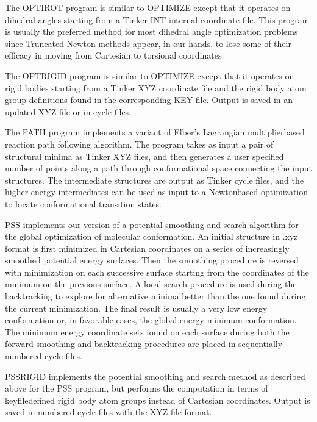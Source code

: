 \documentclass[letterpaper,11pt,english]{sphinxmanual}
\begin{document}

The OPTIROT program is similar to OPTIMIZE except that it operates on dihedral angles starting from a Tinker INT internal coordinate file. This program is usually the preferred method for most dihedral angle optimization problems since Truncated Newton methods appear, in our hands, to lose some of their efficacy in moving from Cartesian to torsional coordinates.


The OPTRIGID program is similar to OPTIMIZE except that it operates on rigid bodies starting from a Tinker XYZ coordinate file and the rigid body atom group definitions found in the corresponding KEY file. Output is saved in an updated XYZ file or in cycle files.


The PATH program implements a variant of Elber’s Lagrangian multiplier\sphinxhyphen{}based reaction path following algorithm. The program takes as input a pair of structural minima as Tinker XYZ files, and then generates a user specified number of points along a path through conformational space connecting the input structures. The intermediate structures are output as Tinker cycle files, and the higher energy intermediates can be used as input to a Newton\sphinxhyphen{}based optimization to locate conformational transition states.


PSS implements our version of a potential smoothing and search algorithm for the global optimization of molecular conformation. An initial structure in .xyz format is first minimized in Cartesian coordinates on a series of increasingly smoothed potential energy surfaces. Then the smoothing procedure is reversed with minimization on each successive surface starting from the coordinates of the minimum on the previous surface. A local search procedure is used during the backtracking to explore for alternative minima better than the one found during the current minimization. The final result is usually a very low energy conformation or, in favorable cases, the global energy minimum conformation. The minimum energy coordinate sets found on each surface during both the forward smoothing and backtracking procedures are placed in sequentially numbered cycle files.


PSSRIGID implements the potential smoothing and search method as described above for the PSS program, but performs the computation in terms of keyfile\sphinxhyphen{}defined rigid body atom groups instead of Cartesian coordinates. Output is saved in numbered cycle files with the XYZ file format.
\end{document}
